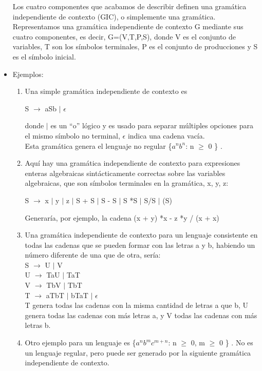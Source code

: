 \documentclass[12pt,a4paper,spanish]{book}
\begin{document}
\begin{itemize}
Los cuatro componentes que acabamos de describir definen una gram\'atica independiente de contexto (GIC), o simplemente una gram\'atica. Representamos una gram\'atica independiente de contexto G mediante sus cuatro componentes, es decir, G=(V,T,P,S), donde V es el conjunto de variables, T son los s\'imbolos terminales, P es el conjunto de producciones y S es el s\'imbolo inicial.

\item Ejemplos:
\begin{enumerate}
\item Una simple gram\'atica independiente de contexto es
\begin{center}
    S $\rightarrow$ aSb $\mid$ $\epsilon$\\
\end{center}
donde $\mid$ es un ``o'' l\'ogico y es usado para separar m\'ultiples opciones para el mismo s\'imbolo no terminal, $\epsilon$ indica una cadena vac\'ia.\\Esta gram\'atica genera el lenguaje no regular \{$a^{n} b^{n}$: n $\ge$ 0 \} .\\
\item Aqu\'i hay una gram\'atica independiente de contexto para expresiones enteras algebraicas sint\'acticamente correctas sobre las variables algebraicas, que son s\'imbolos terminales en la gram\'atica, x, y, z:
\begin{center}
    S $\rightarrow$ x $\mid$ y $\mid$ z $\mid$ S + S $\mid$ S - S $\mid$ S *S $\mid$ S/S $\mid$ (S)
\end{center}
Generar\'ia, por ejemplo, la cadena (x + y) *x - z *y / (x + x)\\
\item Una gram\'atica independiente de contexto para un lenguaje consistente en todas las cadenas que se pueden formar con las letras a y b, habiendo un n\'umero diferente de una que de otra, ser\'ia:\\

    S $\rightarrow$ U $\mid$ V\\
    U $\rightarrow$ TaU $\mid$ TaT\\
    V $\rightarrow$ TbV $\mid$ TbT\\
    T $\rightarrow$ aTbT $\mid$ bTaT $\mid$ $\epsilon$\\

T genera todas las cadenas con la misma cantidad de letras a que b, U genera todas las cadenas con m\'as letras a, y V todas las cadenas con m\'as letras b.\\
\item Otro ejemplo para un lenguaje es \{$a^{n} b^{m} c^{m+n}$: n $\ge$ 0, m $\ge$ 0 \} . No es un lenguaje regular, pero puede ser generado por la siguiente gram\'atica independiente de contexto.\\


\end{enumerate}
\end{itemize}
\end{document}
